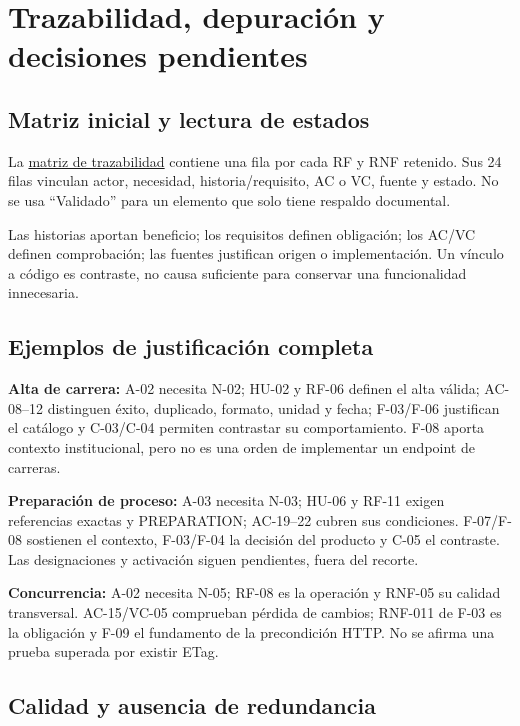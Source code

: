 \documentclass[12pt,a4paper]{report}
\begin{document}
\chapter{Trazabilidad, depuración y decisiones
pendientes}\label{dossier-trazabilidad-depuraciuxf3n-y-decisiones-pendientes}

\section{Matriz inicial y lectura de
estados}\label{dossier-matriz-inicial-y-lectura-de-estados}

La \href{MATRIZ_TRAZABILIDAD.md}{matriz de trazabilidad} contiene una
fila por cada RF y RNF retenido. Sus 24 filas vinculan actor,
necesidad, historia/requisito, AC o VC, fuente y estado. No se usa
``Validado'' para un elemento que solo tiene respaldo documental.

Las historias aportan beneficio; los requisitos definen obligación; los
AC/VC definen comprobación; las fuentes justifican origen o
implementación. Un vínculo a código es contraste, no causa suficiente
para conservar una funcionalidad innecesaria.

\section{Ejemplos de justificación
completa}\label{dossier-ejemplos-de-justificaciuxf3n-completa}

\textbf{Alta de carrera:} A-02 necesita N-02; HU-02 y RF-06
definen el alta válida; AC-08--12 distinguen éxito, duplicado,
formato, unidad y fecha; F-03/F-06 justifican el catálogo y C-03/C-04
permiten contrastar su comportamiento. F-08 aporta contexto
institucional, pero no es una orden de implementar un endpoint de
carreras.

\textbf{Preparación de proceso:} A-03 necesita N-03; HU-06 y
RF-11 exigen referencias exactas y PREPARATION; AC-19--22 cubren
sus condiciones. F-07/F-08 sostienen el contexto, F-03/F-04 la decisión
del producto y C-05 el contraste. Las designaciones y activación siguen
pendientes, fuera del recorte.

\textbf{Concurrencia:} A-02 necesita N-05; RF-08 es la
operación y RNF-05 su calidad transversal. AC-15/VC-05
comprueban pérdida de cambios; RNF-011 de F-03 es la obligación y F-09
el fundamento de la precondición HTTP. No se afirma una prueba superada
por existir ETag.

\section{Calidad y ausencia de
redundancia}\label{dossier-calidad-y-ausencia-de-redundancia}
\end{document}
